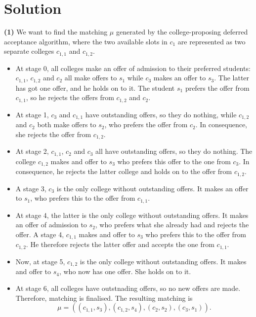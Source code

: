 \documentclass[a4paper]{article}
\newif\ifsolutions
\begin{document}
\ifsolutions
\section*{Solution}
	
	\textbf{(1)} We want to find the matching $\mu$ generated
	by the college-proposing deferred acceptance algorithm, where the
	two available slots in $c_{1}$ are represented as two separate colleges
	$c_{1,1}$ and $c_{1,2}$.
	\begin{itemize}
		\item  At stage 0, all colleges make an offer
		of admission to their preferred students: $c_{1,1}$, $c_{1,2}$ and
		$c_{2}$ all make offers to $s_{1}$ while $c_{3}$ makes an offer
		to $s_{3}$. The latter has got one offer, and he holds on to it.
		The student $s_{1}$ prefers the offer from $c_{1,1}$, so he rejects
		the offers from $c_{1,2}$ and $c_{2}$.
		\item  At stage 1, $c_{3}$ and
		$c_{1,1}$ have outstanding offers, so they do nothing, while $c_{1,2}$
		and $c_{2}$ both make offers to $s_{2}$, who prefers the offer from
		$c_{2}$. In consequence, she rejects the offer from $c_{1,2}$.
		\item At stage 2, $c_{1,1}$, $c_{2}$ and $c_{3}$ all have outstanding offers,
		so they do nothing. The college $c_{1,2}$ makes and offer to $s_{3}$
		who prefers this offer to the one from $c_{3}$. In consequence, he
		rejects the latter college and holds on to the offer from $c_{1,2}$.
		\item A stage 3, $c_{3}$ is the only college without outstanding offers.
		It makes an offer to $s_{1}$, who prefers this to the offer from
		$c_{1,1}$. 
		\item At stage 4, the latter is the only college without outstanding
		offers. It makes an offer of admission to $s_{2}$, who prefers what
		she already had and rejects the offer. A stage 4, $c_{1,1}$ makes
		and offer to $s_{3}$ who prefers this to the offer from $c_{1,2}$.
		He therefore rejects the latter offer and accepts the one from $c_{1,1}$.
		\item Now, at stage 5, $c_{1,2}$ is the only college without outstanding
		offers. It makes and offer to $s_{4}$, who now has one offer. She
		holds on to it. 
		\item At stage 6, all colleges have outstnading offers,
		so no new offers are made. Therefore, matching is finalised. The resulting
		matching is
		\[
		\mu=\left(\left(c_{1,1},s_{3}\right),\left(c_{1,2},s_{4}\right),\left(c_{2},s_{2}\right),\left(c_{3},s_{1}\right)\right).
		\]
	\end{itemize}
	
\end{document}
